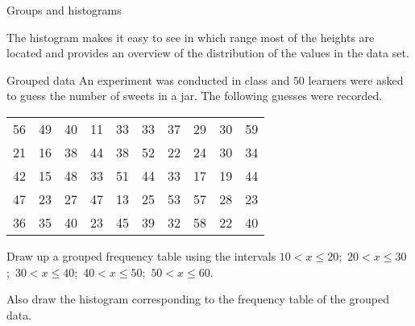 \begin{wex}{Groups and histograms}
{  \begin{center}
  \end{center}

  The histogram makes it easy to see in which range most of the
  heights are located and provides an overview of the distribution of
  the values in the data set.

}
\end{wex}    

\begin{exercises}{Grouped data}
  An experiment was conducted in class and $50$ learners were asked to
  guess the number of sweets in a jar. The following guesses were
  recorded.

  \begin{center}
    \begin{tabular}{cccccccccc}
      \toprule
      56 & 49 & 40 & 11 & 33 & 33 & 37 & 29 & 30 & 59 \\
      21 & 16 & 38 & 44 & 38 & 52 & 22 & 24 & 30 & 34 \\
      42 & 15 & 48 & 33 & 51 & 44 & 33 & 17 & 19 & 44 \\
      47 & 23 & 27 & 47 & 13 & 25 & 53 & 57 & 28 & 23 \\
      36 & 35 & 40 & 23 & 45 & 39 & 32 & 58 & 22 & 40 \\
      \bottomrule
    \end{tabular}
  \end{center}

  Draw up a grouped frequency table using the intervals
  $10 < x \le 20$;\ $20 < x \le 30$;\ $30 < x \le 40$;\ 
  $40 < x \le 50$;\ $50 < x \le 60$.

  Also draw the histogram corresponding to the frequency table of the
  grouped data.

\end{exercises}

